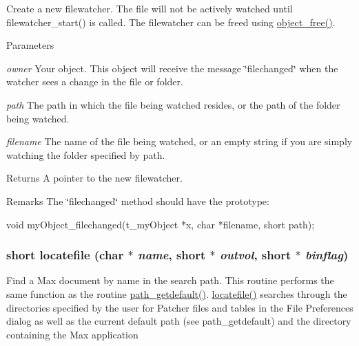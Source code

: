 Create a new filewatcher. The file will not be actively watched until filewatcher\_\-start() is called. The filewatcher can be freed using \hyperlink{group__obj_ga3759846cb356195532c41e35b87522ee}{object\_\-free()}.


\begin{DoxyParams}{Parameters}
\item[{\em owner}]Your object. This object will receive the message \char`\"{}filechanged\char`\"{} when the watcher sees a change in the file or folder. \item[{\em path}]The path in which the file being watched resides, or the path of the folder being watched. \item[{\em filename}]The name of the file being watched, or an empty string if you are simply watching the folder specified by path. \end{DoxyParams}
\begin{DoxyReturn}{Returns}
A pointer to the new filewatcher. 
\end{DoxyReturn}
\begin{DoxyRemark}{Remarks}
The \char`\"{}filechanged\char`\"{} method should have the prototype: 
\begin{DoxyCode}
    void myObject_filechanged(t_myObject *x, char *filename, short path);
\end{DoxyCode}
 
\end{DoxyRemark}
\hypertarget{group__files_ga4d2637351d4a98b83e9a59ef7d500568}{
\subsubsection[{locatefile}]{\setlength{\rightskip}{0pt plus 5cm}short locatefile (char $\ast$ {\em name}, \/  short $\ast$ {\em outvol}, \/  short $\ast$ {\em binflag})}}
\label{group__files_ga4d2637351d4a98b83e9a59ef7d500568}


Find a Max document by name in the search path. This routine performs the same function as the routine \hyperlink{group__files_ga6be29f366820a4cd2aa4f77bcfad362e}{path\_\-getdefault()}. \hyperlink{group__files_ga4d2637351d4a98b83e9a59ef7d500568}{locatefile()} searches through the directories specified by the user for Patcher files and tables in the File Preferences dialog as well as the current default path (see path\_\-getdefault) and the directory containing the Max application


